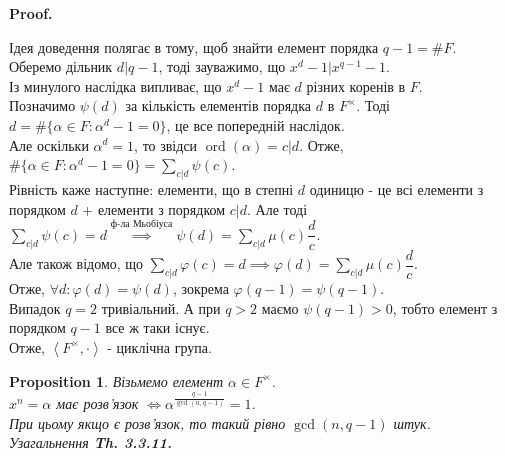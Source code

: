 \documentclass[a4paper, 10pt]{article}
\makeatletter
\theoremstyle{theoremdd}
\theoremstyle{theoremdd}
\theoremstyle{theoremdd}
\theoremstyle{theoremdd}
\theoremstyle{theoremdd}
\newtheorem{proposition}[theorem]{Proposition}
\theoremstyle{theoremdd}
\theoremstyle{theoremdd}
\theoremstyle{theoremdd}
\renewenvironment{proof}[1][Proof.\\]{\par
\pushQED{\hfill \qed}%
\normalfont \topsep6\p@\@plus6\p@\relax
\trivlist
\item\relax
{\bfseries
#1\@addpunct{.}}\hspace\labelsep\ignorespaces
}{%
\popQED\endtrivlist\@endpefalse
}
\DeclareMathOperator{\ord}{ord}
\makeatother
\begin{document}
\begin{proof}
Ідея доведення полягає в тому, щоб знайти елемент порядка $q-1 = \# F$.\\
Оберемо дільник $d | q-1$, тоді зауважимо, що $x^d -1 | x^{q-1}-1$.\\

Із минулого наслідка випливає, що $x^d - 1$ має $d$ різних коренів в $F$.\\
Позначимо $\psi(d)$ за кількість елементів порядка $d$ в $F^\times$. Тоді\\
$d = \# \{ \alpha \in F: \alpha^d - 1 = 0 \}$, це все попередній наслідок.\\
Але оскільки $\alpha^d = 1$, то звідси $\ord(\alpha) = c | d$. Отже,\\
$\# \{\alpha \in F: \alpha^d - 1 = 0\} = \displaystyle\sum_{c | d} \psi(c)$.\\
Рівність каже наступне: елементи, що в степні $d$ одиницю - це всі елементи з порядком $d$ + елементи з порядком $c | d$. Але тоді\\
$\displaystyle\sum_{c | d} \psi(c) = d \overset{\text{ф-ла Мьобіуса}}{\implies} \psi(d) = \sum_{c | d} \mu(c) \dfrac{d}{c}$.\\
Але також відомо, що $\displaystyle\sum_{c | d} \varphi(c) =d \implies \varphi(d) = \sum_{c | d} \mu(c) \dfrac{d}{c}$.\\
Отже, $\forall d: \varphi(d) = \psi(d)$, зокрема $\varphi(q-1) = \psi(q-1)$.\\
Випадок $q = 2$ тривіальний. А при $q > 2$ маємо $\psi(q-1) > 0$, тобто елемент з порядком $q-1$ все ж таки існує.\\
Отже, $\left< F^\times, \cdot \right>$ - циклічна група.
\end{proof}

\begin{proposition}
Візьмемо елемент $\alpha \in F^\times$.\\
$x^n = \alpha$ має розв'язок $\iff \alpha^{\frac{q-1}{\gcd(n,q-1)}} = 1$.\\
При цьому якщо є розв'язок, то такий рівно $\gcd(n,q-1)$ штук.\\
\textit{Узагальнення \textbf{Th. 3.3.11.}}
\end{proposition}
\end{document}
